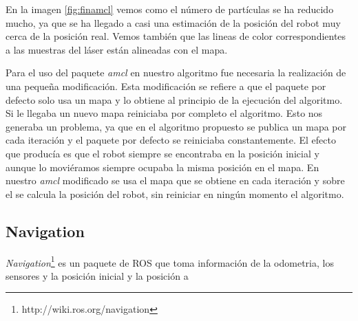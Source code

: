 En la imagen \ref{fig:finamcl} vemos como el número de partículas se ha reducido mucho, ya que se ha llegado a casi una estimación de la posición del robot muy cerca de la posición real. Vemos también que las lineas de color correspondientes a las muestras del láser están alineadas con el mapa.

Para el uso del paquete \textit{amcl} en nuestro algoritmo fue necesaria la realización de una pequeña modificación. Esta modificación se refiere a que el paquete por defecto solo usa un mapa y lo obtiene al principio de la ejecución del algoritmo. Si le llegaba un nuevo mapa reiniciaba por completo el algoritmo. Esto nos generaba un problema, ya que en el algoritmo propuesto se publica un mapa por cada iteración y el paquete por defecto se reiniciaba constantemente. El efecto que producía es que el robot siempre se encontraba en la posición inicial y aunque lo moviéramos siempre ocupaba la misma posición en el mapa. En nuestro \textit{amcl} modificado se usa el mapa que se obtiene en cada iteración y sobre el se calcula la posición del robot, sin reiniciar en ningún momento el algoritmo.

\subsection{Navigation}
\label{sec:navigation}
\textit{Navigation}\footnote{http://wiki.ros.org/navigation} es un paquete de ROS que toma información de la odometria, los sensores y la posición inicial y la posición a 